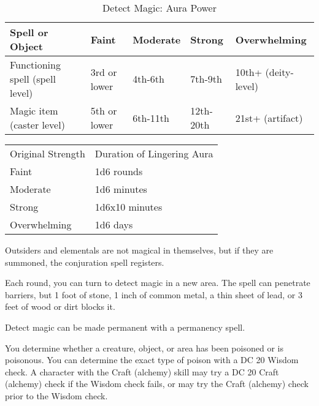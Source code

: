 \begin{multicols}{2}
\begin{small}
\begin{center}
\begin{table*}[b!]
\caption{Detect Magic: Aura Power}
\begin{tabular}[h!]{l|llll}
Spell or Object & Faint & Moderate & Strong & Overwhelming \\ \hline
Functioning spell (spell level) & 3rd or lower & 4th-6th & 7th-9th & 10th+ (deity-level) \\
Magic item (caster level) & 5th or lower & 6th-11th & 12th-20th & 21st+ (artifact) \\
\end{tabular}
\end{table*}
\end{center}

\begin{center}
\begin{tabular}[h!]{l|l}
Original Strength & Duration of Lingering Aura \\
Faint & 1d6 rounds \\
Moderate & 1d6 minutes \\
Strong & 1d6x10 minutes \\
Overwhelming & 1d6 days \\
\end{tabular}
\end{center}

\smallskip\noindent Outsiders and elementals are not magical in themselves, but if they are summoned, the conjuration spell registers.

\smallskip\noindent Each round, you can turn to detect magic in a new area. The spell can penetrate barriers, but 1 foot of stone, 1 inch of common metal, a thin sheet of lead, or 3 feet of wood or dirt blocks it.

\smallskip\noindent Detect magic can be made permanent with a permanency spell.

\noindent You determine whether a creature, object, or area has been poisoned or is poisonous. You can determine the exact type of poison with a DC 20 Wisdom check. A character with the Craft (alchemy) skill may try a DC 20 Craft (alchemy) check if the Wisdom check fails, or may try the Craft (alchemy) check prior to the Wisdom check.


\end{small}
\end{multicols}
